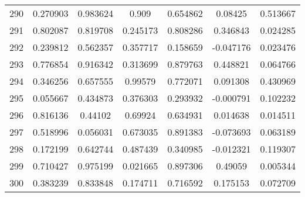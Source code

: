 \begin{table}
\begin{tabular}{c|c|c|c|c|c|c}
290 & 0.270903 & 0.983624 & 0.909 & 0.654862 & 0.08425 & 0.513667\\
291 & 0.802087 & 0.819708 & 0.245173 & 0.808286 & 0.346843 & 0.024285\\
292 & 0.239812 & 0.562357 & 0.357717 & 0.158659 & -0.047176 & 0.023476\\
293 & 0.776854 & 0.916342 & 0.313699 & 0.879763 & 0.448821 & 0.064766\\
294 & 0.346256 & 0.657555 & 0.99579 & 0.772071 & 0.091308 & 0.430969\\
295 & 0.055667 & 0.434873 & 0.376303 & 0.293932 & -0.000791 & 0.102232\\
296 & 0.816136 & 0.44102 & 0.69924 & 0.634931 & 0.014638 & 0.014511\\
297 & 0.518996 & 0.056031 & 0.673035 & 0.891383 & -0.073693 & 0.063189\\
298 & 0.172199 & 0.642744 & 0.487439 & 0.340985 & -0.012321 & 0.119307\\
299 & 0.710427 & 0.975199 & 0.021665 & 0.897306 & 0.49059 & 0.005344\\
300 & 0.383239 & 0.833848 & 0.174711 & 0.716592 & 0.175153 & 0.072709\\
\end{tabular}
\end{table}
\newpage
